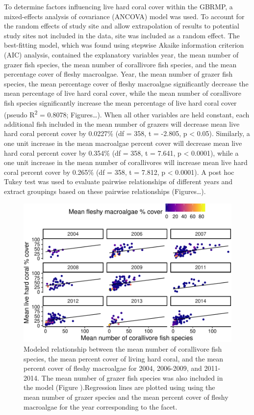 \documentclass[12pt,]{article}
\begin{document}
To determine factors influencing live hard coral cover within the GBRMP,
a mixed-effects analysis of covariance (ANCOVA) model was used. To
account for the random effects of study site and allow extrapolation of
results to potential study sites not included in the data, site was
included as a random effect. The best-fitting model, which was found
using stepwise Akaike information criterion (AIC) analysis, contained
the explanatory variables year, the mean number of grazer fish species,
the mean number of corallivore fish species, and the mean percentage
cover of fleshy macroalgae. Year, the mean number of grazer fish
species, the mean percentage cover of fleshy macroalgae significantly
decrease the mean percentage of live hard coral cover, while the mean
number of corallivore fish species significantly increase the mean
percentage of live hard coral cover (pseudo R\textsuperscript{2} =
0.8078; Figures\ldots{}). When all other variables are held constant,
each additional fish included in the mean number of grazers will
decrease mean live hard coral percent cover by 0.0227\% (df = 358, t =
-2.805, p \textless{} 0.05). Similarly, a one unit increase in the mean
macroalgae percent cover will decrease mean live hard coral percent
cover by 0.354\% (df = 358, t = 7.641, p \textless{} 0.0001), while a
one unit increase in the mean number of corallivores will increase mean
live hard coral percent cover by 0.265\% (df = 358, t = 7.812, p
\textless{} 0.0001). A post hoc Tukey test was used to evaluate pairwise
relationships of different years and extract groupings based on these
pairwise relationships (Figures\ldots{}).

\begin{figure}

\includegraphics{Mullaney_ENV872_Project_files/figure-latex/Coral Percent Cover Plot (Corallivores)-1} \hfill{}

\caption{Modeled relationship between the mean number of corallivore fish species, the mean percent cover of living hard coral, and the mean percent cover of fleshy macroalgae for 2004, 2006-2009, and 2011-2014. The mean number of grazer fish species was also included in the model (Figure ).Regression lines are plotted using using the mean number of grazer species and the mean percent cover of fleshy macroalgae for the year corresponding to the facet.}\label{fig:Coral Percent Cover Plot (Corallivores)}
\end{figure}
\end{document}
